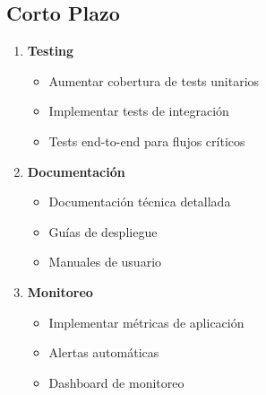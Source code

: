 \documentclass[12pt,a4paper]{article}
\begin{document}
\subsection{Corto Plazo}
\begin{enumerate}
    \item \textbf{Testing}
    \begin{itemize}
        \item Aumentar cobertura de tests unitarios
        \item Implementar tests de integración
        \item Tests end-to-end para flujos críticos
    \end{itemize}
    
    \item \textbf{Documentación}
    \begin{itemize}
        \item Documentación técnica detallada
        \item Guías de despliegue
        \item Manuales de usuario
    \end{itemize}
    
    \item \textbf{Monitoreo}
    \begin{itemize}
        \item Implementar métricas de aplicación
        \item Alertas automáticas
        \item Dashboard de monitoreo
    \end{itemize}
\end{enumerate}
\end{document}

